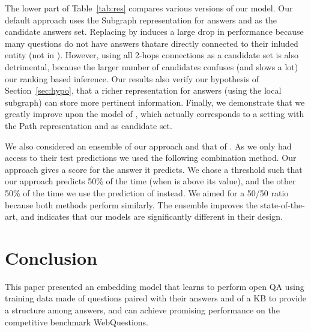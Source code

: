 \documentclass[runningheads,a4paper]{llncs}
\newcommand{\wq}{{\sc WebQuestions}\xspace}
\begin{document}
The lower part of Table~\ref{tab:res} compares various versions of our
model. Our default approach uses the Subgraph representation for
answers and  as the candidate answers set.
Replacing  by  induces a large drop in performance because
many questions do not have answers thatare directly connected to their
inluded entity (not in ). However, using all 2-hops connections
as a candidate set is also detrimental, because the larger number of
candidates confuses (and slows a lot) our ranking based inference.
Our results also verify our hypothesis of Section~\ref{sec:hypo},
that a richer representation for answers (using the local subgraph)
can store more pertinent information.
Finally, we demonstrate that we greatly improve upon the model of
\cite{bordes2014open}, which actually corresponds to a setting with
the Path representation and  as candidate set.

We also considered an ensemble of our approach and that of
\cite{berant2014semantic}.  As we only had access to their test
predictions we used the following combination method. Our approach
gives a score  for the answer it predicts. We chose a
threshold such that our approach predicts 50\% of the time (when
 is above its value), and the other 50\% of the time we
use the prediction of \cite{berant2014semantic} instead. 
We aimed for a 50/50 ratio because both methods perform similarly.
The ensemble improves the state-of-the-art, and indicates that
our models are significantly different in their design.

\section{Conclusion}
This paper presented an embedding model that learns to perform open QA
using training data made of questions paired with their answers and of
a KB to provide a structure among answers, and can achieve
promising performance on the competitive benchmark \wq.




\end{document}
